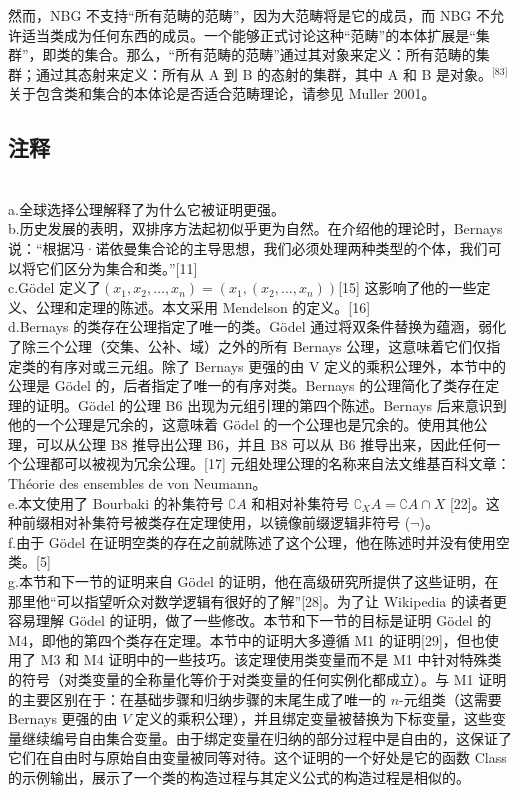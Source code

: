 然而，NBG 不支持“所有范畴的范畴”，因为大范畴将是它的成员，而 NBG 不允许适当类成为任何东西的成员。一个能够正式讨论这种“范畴”的本体扩展是“集群”，即类的集合。那么，“所有范畴的范畴”通过其对象来定义：所有范畴的集群；通过其态射来定义：所有从 A 到 B 的态射的集群，其中 A 和 B 是对象。\(^\text{[83]}\)关于包含类和集合的本体论是否适合范畴理论，请参见 Muller 2001。
\subsection{注释} \\
a.全球选择公理解释了为什么它被证明更强。\\  
b.历史发展的表明，双排序方法起初似乎更为自然。在介绍他的理论时，Bernays 说：“根据冯·诺依曼集合论的主导思想，我们必须处理两种类型的个体，我们可以将它们区分为集合和类。”[11]\\  
c.Gödel 定义了\((x_1, x_2, \dots, x_n) = (x_1, (x_2, \dots, x_n))\)[15] 这影响了他的一些定义、公理和定理的陈述。本文采用 Mendelson 的定义。[16]\\
d.Bernays 的类存在公理指定了唯一的类。Gödel 通过将双条件替换为蕴涵，弱化了除三个公理（交集、公补、域）之外的所有 Bernays 公理，这意味着它们仅指定类的有序对或三元组。除了 Bernays 更强的由 V 定义的乘积公理外，本节中的公理是 Gödel 的，后者指定了唯一的有序对类。Bernays 的公理简化了类存在定理的证明。Gödel 的公理 B6 出现为元组引理的第四个陈述。Bernays 后来意识到他的一个公理是冗余的，这意味着 Gödel 的一个公理也是冗余的。使用其他公理，可以从公理 B8 推导出公理 B6，并且 B8 可以从 B6 推导出来，因此任何一个公理都可以被视为冗余公理。[17] 元组处理公理的名称来自法文维基百科文章：Théorie des ensembles de von Neumann。\\
e.本文使用了 Bourbaki 的补集符号 \(\complement A\) 和相对补集符号 \(\complement_X A = \complement A \cap X\) [22]。这种前缀相对补集符号被类存在定理使用，以镜像前缀逻辑非符号 (\(\neg\))。\\  
f.由于 Gödel 在证明空类的存在之前就陈述了这个公理，他在陈述时并没有使用空类。[5]\\
g.本节和下一节的证明来自 Gödel 的证明，他在高级研究所提供了这些证明，在那里他“可以指望听众对数学逻辑有很好的了解”[28]。为了让 Wikipedia 的读者更容易理解 Gödel 的证明，做了一些修改。本节和下一节的目标是证明 Gödel 的 M4，即他的第四个类存在定理。本节中的证明大多遵循 M1 的证明[29]，但也使用了 M3 和 M4 证明中的一些技巧。该定理使用类变量而不是 M1 中针对特殊类的符号（对类变量的全称量化等价于对类变量的任何实例化都成立）。与 M1 证明的主要区别在于：在基础步骤和归纳步骤的末尾生成了唯一的 \(n\)-元组类（这需要 Bernays 更强的由 \(V\) 定义的乘积公理），并且绑定变量被替换为下标变量，这些变量继续编号自由集合变量。由于绑定变量在归纳的部分过程中是自由的，这保证了它们在自由时与原始自由变量被同等对待。这个证明的一个好处是它的函数 Class 的示例输出，展示了一个类的构造过程与其定义公式的构造过程是相似的。\\
